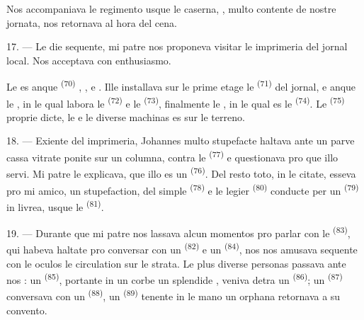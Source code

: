 Nos accompaniava le regimento usque le caserna, , multo contente de
nostre jornata, nos retornava al hora del cena.

\VUsaut{3.0mm}

17. --- Le die sequente, mi patre nos proponeva visitar le imprimeria del jornal
local. Nos acceptava con enthusiasmo.

Le  es anque  \textsuperscript{(70)}
, ,  e
. Ille installava sur le prime etage le 
\textsuperscript{(71)} del jornal, e anque le , in le
qual labora le  \textsuperscript{(72)} e le
 \textsuperscript{(73)}, finalmente le
, in le qual es le  \textsuperscript{(74)}. Le 
\textsuperscript{(75)} proprie dicte, le  e le diverse machinas es
sur le terreno.

\VUsaut{3.0mm}

18. --- Exiente del imprimeria, Johannes multo stupefacte haltava ante un parve
cassa vitrate ponite sur un columna, contra le 
\textsuperscript{(77)} e questionava pro que illo servi. Mi patre le explicava,
que illo es un  \textsuperscript{(76)}. Del resto
toto, in le citate, esseva pro mi amico, un stupefaction, del simple
 \textsuperscript{(78)} e le legier  \textsuperscript{(80)} conducte per un 
\textsuperscript{(79)} in livrea, usque le 
\textsuperscript{(81)}.

19. --- Durante que mi patre nos lassava alcun momentos pro parlar con le
 \textsuperscript{(83)}, qui habeva haltate pro
conversar con un  \textsuperscript{(82)} e un 
\textsuperscript{(84)}, nos nos amusava sequente con le oculos le circulation sur
le strata. Le plus diverse personas passava ante nos : un  \textsuperscript{(85)}, portante in un corbe un splendide
, veniva detra un 
\textsuperscript{(86)}; un  \textsuperscript{(87)}
conversava con un  \textsuperscript{(88)}, un
 \textsuperscript{(89)} tenente in le mano un orphana retornava
a su convento.

